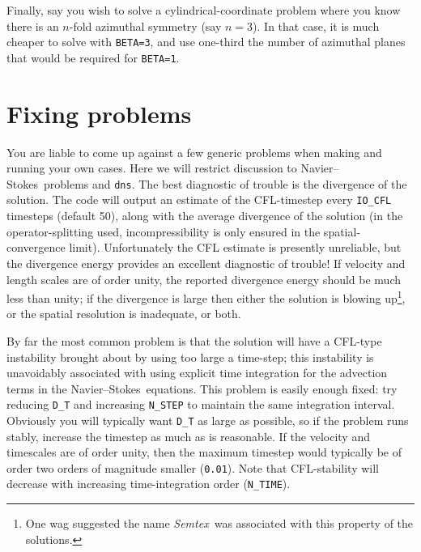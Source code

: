 \documentclass[11pt,a4paper]{report}
\newcommand{\Semtex}{\emph{Semtex}}
\newcommand\NavSto{Navier--Stokes}
\begin{document}
Finally, say you wish to solve a cylindrical-coordinate problem where
you know there is an $n$-fold azimuthal symmetry (say $n=3$). In that
case, it is much cheaper to solve with \verb+BETA=3+, and use
one-third the number of azimuthal planes that would be required for
\verb+BETA=1+.

\section{Fixing problems}
\label{sec.fix}

You are liable to come up against a few generic problems when making
and running your own cases. Here we will restrict discussion to
\NavSto\ problems and \verb+dns+. The best diagnostic of trouble is
the divergence of the solution. The code will output an estimate of
the CFL-timestep every \verb+IO_CFL+ timesteps (default 50), along
with the average divergence of the solution (in the operator-splitting
used, incompressibility is only ensured in the spatial-convergence
limit). Unfortunately the CFL estimate is presently unreliable, but
the divergence energy provides an excellent diagnostic of trouble!  If
velocity and length scales are of order unity, the reported divergence
energy should be much less than unity; if the divergence is large then
either the solution is blowing up\footnote{One wag suggested the name
  \Semtex\ was associated with this property of the solutions.}, or
the spatial resolution is inadequate, or both.

By far the most common problem is that the solution will have a
CFL-type instability brought about by using too large a time-step;
this instability is unavoidably associated with using explicit time
integration for the advection terms in the \NavSto\ equations. This
problem is easily enough fixed: try reducing \verb+D_T+ and increasing
\verb+N_STEP+ to maintain the same integration interval. Obviously you
will typically want \verb+D_T+ as large as possible, so if the problem
runs stably, increase the timestep as much as is reasonable. If the
velocity and timescales are of order unity, then the maximum timestep
would typically be of order two orders of magnitude smaller
(\verb+0.01+). Note that CFL-stability will decrease with increasing
time-integration order (\verb+N_TIME+).
\end{document}
